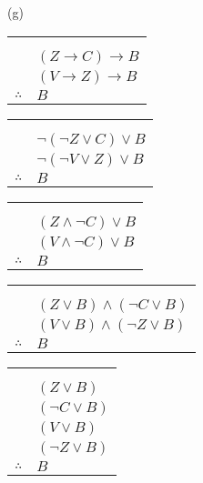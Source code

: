 \documentclass{article}
\begin{document}
(g)  \newline
\begin{tabular}{c@{\,}l@{}} 
                         & \\ & \\
                         & $(Z \rightarrow C) \rightarrow B$ \\
                         & $(V \rightarrow Z) \rightarrow B$ \\
\arrayrulecolor{blue}
\cline{2-2}
    $\therefore$         & $B$ \\
\end{tabular}
\begin{tabular}{c@{\,}l@{}} 
                         & \\ & \\
                         & $\neg (\neg Z \vee C) \vee B$ \\
                         & $\neg(\neg V \vee Z) \vee B$ \\
\arrayrulecolor{blue}
\cline{2-2}
    $\therefore$         & $B$ \\
\end{tabular}
\begin{tabular}{c@{\,}l@{}} 
                         & \\ & \\
                         & $( Z \wedge \neg C) \vee B$ \\
                         & $(V \wedge \neg C) \vee B$ \\
\arrayrulecolor{blue}
\cline{2-2}
    $\therefore$         & $B$ \\
\end{tabular}
\begin{tabular}{c@{\,}l@{}} 
                         & \\ & \\
                         & $( Z \vee B) \wedge (\neg C \vee B)$ \\
                         & $( V \vee B) \wedge (\neg Z \vee B)$ \\
\arrayrulecolor{blue}
\cline{2-2}
    $\therefore$         & $B$ \\
\end{tabular} 
\newline
\begin{tabular}{c@{\,}l@{}} 
                         & \\ & \\
                         & $(Z \vee B)$ \\
                         & $(\neg C \vee B)$ \\
                         & $(V \vee B)$ \\
                         & $(\neg Z \vee B)$ \\
\arrayrulecolor{blue}
\cline{2-2}
    $\therefore$         & $B$ \\
\end{tabular}
\end{document}
